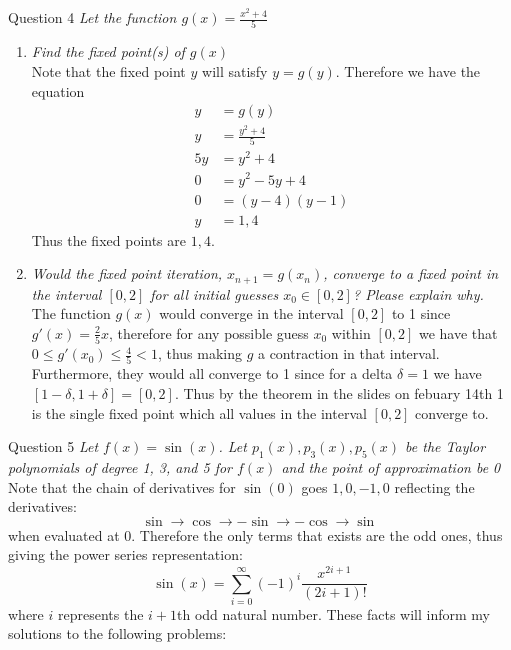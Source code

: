 \documentclass[12pt, letterpaper]{article}
\begin{document}
	\item{Question 4} \textit{Let the function $g(x) = \frac{x^2+ 4}{5}$}
	\begin{enumerate}
		\item \textit{Find the fixed point(s) of $g(x)$}\\
		Note that the fixed point $y$ will satisfy $y = g(y)$.  Therefore we have the equation 
		\begin{align*}
			y &= g(y)\\
			y &= \frac{y^2 + 4}{5}\\
			5y &= y^2 + 4\\
			0 &= y^2 - 5y + 4\\
			0 &= (y - 4)(y - 1)\\
			y &= 1,4
		\end{align*}
		Thus the fixed points are $1,4$.
		\item \textit{Would the fixed point iteration, $x_{n+1} = g(x_n )$, converge to a fixed point in the interval
		$[0, 2]$ for all initial guesses $x_0 \in [0, 2]$? Please explain why.}\\
		The function $g(x)$ would converge in the interval $[0,2]$ to 1 since $g'(x) = \frac{2}{5}x$, therefore for any possible 
		guess $x_0$ within $[0,2]$ we have that $0 \leq g'(x_0) \leq \frac{4}{5} < 1$, thus making $g$ a contraction in that interval.
		Furthermore, they would all converge to 1 since for a delta $\delta = 1$ we have $[ 1 - \delta, 1 + \delta] = [0,2]$.  
		Thus by the theorem in the slides on febuary 14th 1 is the single fixed point which all values in the interval 
		$[0,2]$ converge to.  
	\end{enumerate}
	\item{Question 5}  \textit{Let $f (x) = \sin(x)$. Let $p_1 (x), p_3 (x), p_5 (x)$ be the Taylor polynomials of degree 1, 3, 
	and 5 for $f (x)$ and the point of approximation be 0}
	Note that the chain of derivatives for $\sin(0)$ goes 
	$1, 0, -1, 0$ reflecting the derivatives: 
	$$\sin \to \cos \to -\sin \to -\cos \to \sin$$ when evaluated at 0.  Therefore the only terms that exists are 
	the odd ones, thus giving the power series representation:
	$$
	\sin(x) = \sum_{i=0}^\infty (-1)^i \frac{x^{2i+1}}{(2i+1)!}
	$$
	where $i$ represents the $i+1$th odd natural number.  These facts will inform my solutions to the following 
	problems:
\end{document}
